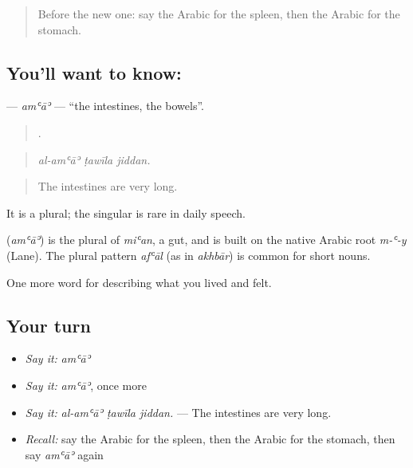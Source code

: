 \begin{quote}
Before the new one: say the Arabic for the spleen, then the Arabic for the stomach.
\end{quote}

\subsection*{You'll want to know: }
\textbf{} — \emph{amʿāʾ} — \textquotedblleft{}the intestines, the bowels\textquotedblright{}.

\begin{quote}
  .
\end{quote}

\begin{quote}
\emph{al-amʿāʾ ṭawīla jiddan.}
\end{quote}

\begin{quote}
The intestines are very long.
\end{quote}

It is a plural; the singular  is rare in daily speech.

\begin{cousinweb}
\textbf{} (\emph{amʿāʾ}) is the plural of \emph{miʿan}, a gut, and is built on the native Arabic root \emph{m-ʿ-y} (Lane). The plural pattern \emph{afʿāl} (as in \emph{akhbār}) is common for short nouns.
\end{cousinweb}

\begin{grammarlens}[title={What you've built}]
One more word for describing what you lived and felt.
\end{grammarlens}

\subsection*{Your turn}
\begin{itemize}
\raggedright
  \item \emph{Say it:} \emph{amʿāʾ}
  \item \emph{Say it:} \emph{amʿāʾ}, once more
  \item \emph{Say it:} \emph{al-amʿāʾ ṭawīla jiddan.} — The intestines are very long.
  \item \emph{Recall:} say the Arabic for the spleen, then the Arabic for the stomach, then say \emph{amʿāʾ} again
\end{itemize}

